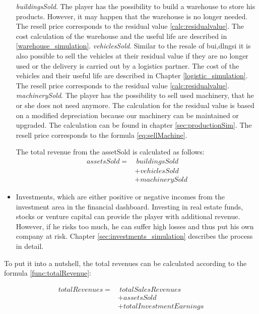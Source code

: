 \begin{itemize}
        \subitem \textit{buildingsSold}. The player has the possibility to build a warehouse to store his products. However, it may happen that the warehouse is no longer needed. The resell price corresponds to the residual value \ref{calc:residualvalue}. The cost calculation of the warehouse and the useful life are described in \ref{warehouse_simulation}.
        \subitem \textit{vehiclesSold}. Similar to the resale of bui,dlngsi it is also possible to sell the vehicles at their residual value if they are no longer used or the delivery is carried out by a logistics partner. The cost of the vehicles and their useful life are described in Chapter \ref{logistic_simulation}. The resell price corresponds to the residual value \ref{calc:residualvalue}.
     \subitem \textit{machinerySold}. The player has the possibility to sell used machinery, that he or she does not need anymore. The calculation for the residual value is based on a modified depreciation because our machinery can be maintained or upgraded. The calculation can be found in chapter \ref{sec:productionSim}. The resell price corresponds to the formula \ref{eq:sellMachine}.

The total revenue from the assetSold is calculated as follows:
\begin{equation}
\label{func:assetsSold}
\begin{aligned}
    assetsSold= & ~ buildingsSold \\
    & + vehiclesSold \\
    & + machinerySold
\end{aligned}
\end{equation}

    \item Investments, which are either positive or negative incomes from the investment area in the financial dashboard. Investing in real estate funds, stocks or venture capital can provide the player with additional revenue. However, if he risks too much, he can suffer high losses and thus put his own company at risk. Chapter \ref{sec:investments_simulation} describes the process in detail.
\end{itemize}

To put it into a nutshell, the total revenues can be calculated according to the formula \ref{func:totalRevenue}:

\begin{equation}
\label{func:totalRevenue}
\begin{aligned}
    totalRevenues = & ~totalSalesRevenues \\
    & + assetsSold \\
    & + totalInvestmentEarnings \\
\end{aligned}
\end{equation}

